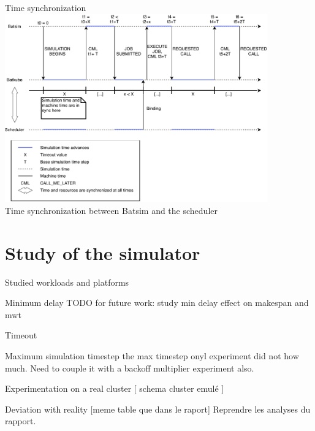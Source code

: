 \documentclass[12pt, aspectratio=43]{beamer}
\begin{document}
\begin{frame}{Time synchronization}
	\centering
	\includegraphics[width=0.85\textwidth]{../imgs/lignes_de_temps.pdf}\\
	\small{Time synchronization between Batsim and the scheduler}
\end{frame}

\section{Study of the simulator}
\begin{frame}{Studied workloads and platforms}
\end{frame}

\begin{frame}{Minimum delay}
	TODO for future work: study min delay effect on makespan and mwt
\end{frame}

\begin{frame}{Timeout}
\end{frame}

\begin{frame}{Maximum simulation timestep}
	the max timestep onyl experiment did not how much. Need to couple it
	with a backoff multiplier experiment also.
\end{frame}

\begin{frame}{Experimentation on a real cluster}
	[ schema cluster emulé ]
\end{frame}

\begin{frame}{Deviation with reality}
	[meme table que dans le raport]
	Reprendre les analyses du rapport.
\end{frame}
\end{document}
